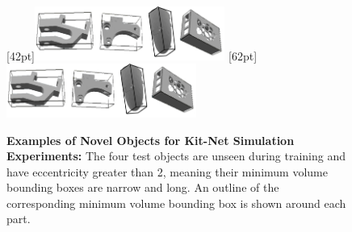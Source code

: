 \begin{figure}[t]
  \centering %
  \hfill%
  [42pt]{\includegraphics[height=50pt, trim=581 18 250 0, clip]{figures/Industrial Prismatic Cavity Task Objects.png}}%
  \hfill%
  \hfill%
  [62pt]{\includegraphics[height=50pt, trim=743 26 14 14, clip]{figures/Industrial Prismatic Cavity Task Objects.png}}
  \caption{\textbf{Examples of Novel Objects for Kit-Net Simulation Experiments: }
  The four test objects are unseen during training and have eccentricity greater than 2, meaning their minimum volume bounding boxes are narrow and long. An outline of the corresponding minimum volume bounding box is shown around each part.}
  \label{fig:prism-task-eval-objects}
\end{figure}

